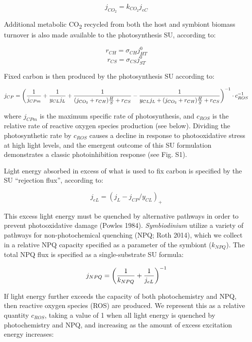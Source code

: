 \documentclass[]{elsarticle} %
\begin{document}
\begin{equation} j_{CO_2} = k_{CO_2}j_{eC} \end{equation}

Additional metabolic CO\textsubscript{2} recycled from both the host and
symbiont biomass turnover is also made available to the photosynthesis
SU, according to:

\begin{equation} r_{CH}=\sigma_{CH}j_{HT}^0 \end{equation}\begin{equation} r_{CS}=\sigma_{CS}j_{ST}^0 \end{equation}

Fixed carbon is then produced by the photosynthesis SU according to:

\begin{equation} j_{CP} = \bigg({1 \over j_{CPm}} + {1 \over {y_{CL} j_L }} + {1 \over {(j_{CO_2} + r_{CH}){H \over S} + r_{CS}}} - {1 \over {y_{CL} j_L + (j_{CO_2} + r_{CH}){H \over S} + r_{CS}}}\bigg)^{-1} \cdot c_{ROS}^{-1} \end{equation}

where \(j_{CPm}\) is the maximum specific rate of photosynthesis, and
\(c_{ROS}\) is the relative rate of reactive oxygen species production
(see below). Dividing the photosynthetic rate by \(c_{ROS}\) causes a
decline in response to photooxidative stress at high light levels, and
the emergent outcome of this SU formulation demonstrates a classic
photoinhibition response (see Fig. S1).

Light energy absorbed in excess of what is used to fix carbon is
specified by the SU ``rejection flux'', according to:

\begin{equation} j_{eL} = (j_L - j_{CP} / y_{CL})_+ \end{equation}

This excess light energy must be quenched by alternative pathways in
order to prevent photooxidative damage (Powles 1984).
\emph{Symbiodinium} utilize a variety of pathways for non-photochemical
quenching (NPQ; Roth 2014), which we collect in a relative NPQ capacity
specified as a parameter of the symbiont (\(k_{NPQ}\)). The total NPQ
flux is specified as a single-substrate SU formula:

\begin{equation} j_{NPQ} = \bigg({1 \over k_{NPQ}} + {1 \over j_{eL}}\bigg)^{-1} \end{equation}

If light energy further exceeds the capacity of both photochemistry and
NPQ, then reactive oxygen species (ROS) are produced. We represent this
as a relative quantity \(c_{ROS}\), taking a value of 1 when all light
energy is quenched by photochemistry and NPQ, and increasing as the
amount of excess excitation energy increases:
\end{document}
